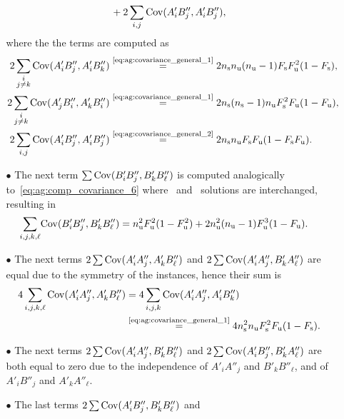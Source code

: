 \begin{itemize}
\begin{itemize}
\begin{align*}
          &\quad + 2 \sum_{i, j} {\mathrm{Cov}}(A'_i B''_j, A'_i B''_j),
        \end{align*}
        where the the terms are computed as
        \begin{align*}
          2 \sum_{\substack{i \\ j \ne k}} {\mathrm{Cov}}(A'_i B''_j, A'_i B''_k)
            &\stackrel{\text{\eqref{eq:ag:covariance_general_1}}}{=}
              2 n_\text{s}n_\text{u}(n_\text{u}-1) F_\text{s} F_\text{u}^2 (1 - F_\text{s}), \\
          2 \sum_{\substack{i \\ j \ne k}} {\mathrm{Cov}}(A'_j B''_i, A'_k B''_i)
            &\stackrel{\text{\eqref{eq:ag:covariance_general_1}}}{=}
              2 n_\text{s} (n_\text{s}-1) n_\text{u} F_\text{s}^2 F_\text{u} (1 - F_\text{u}), \\
          2 \sum_{i, j} {\mathrm{Cov}}(A'_i B''_j, A'_i B''_j)
            &\stackrel{\text{\eqref{eq:ag:covariance_general_2}}}{=}
              2n_\text{s}n_\text{u} F_\text{s} F_\text{u} ( 1 - F_\text{s} F_\text{u}).
        \end{align*}
      \item[$\bullet$]
        The next term $\sum {\mathrm{Cov}}(B'_i B''_j, B'_k B''_\ell)$ is computed
        analogically to~\eqref{eq:ag:comp_covariance_6}
        where \good\ and \bad\ solutions are interchanged, resulting in
        \begin{align*}
          \sum_{i,j,k,\ell} &{\mathrm{Cov}}(B'_i B''_j, B'_k B''_\ell)
            = n_\text{u}^2 F_\text{u}^2 ( 1 - F_\text{u}^2) + 2 n_\text{u}^2(n_\text{u}-1) F_\text{u}^3 (1 - F_\text{u}).
        \end{align*}
      \item[$\bullet$]
        The next terms $2\sum {\mathrm{Cov}}(A'_i A''_j, A'_k B''_\ell)$ and
        $2\sum {\mathrm{Cov}}(A'_i A''_j, B'_k A''_\ell)$ are equal due to the
        symmetry of the instances, hence their sum is
        \begin{align}\label{eq:ag:comp_covariance_7}
          4 \sum_{i,j,k,\ell} {\mathrm{Cov}}(A'_i A''_j, A'_k B''_\ell)
            &= 4 \sum_{i,j,k} {\mathrm{Cov}}(A'_i A''_j, A'_i B''_k) \notag \\
            &\stackrel{\text{\eqref{eq:ag:covariance_general_1}}}{=} 4 n_\text{s}^2 n_\text{u} F_\text{s}^2 F_\text{u} ( 1 - F_\text{s} ).
        \end{align}
      \item[$\bullet$]
        The next terms $2\sum {\mathrm{Cov}}(A'_i A''_j, B'_k B''_\ell)$ and
        $2\sum {\mathrm{Cov}}(A'_i B''_j, B'_k A''_\ell)$ are both equal to zero
        due to the independence of $A'_i A''_j$ and $B'_k B''_\ell$, and
        of $A'_i B''_j$ and $A'_k A''_\ell$.
      \item[$\bullet$]
        The last terms $2\sum {\mathrm{Cov}}(A'_i B''_j, B'_k B''_\ell)$ and

\end{itemize}
\end{itemize}
